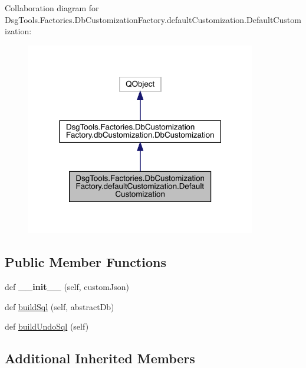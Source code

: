 Collaboration diagram for Dsg\+Tools.\+Factories.\+Db\+Customization\+Factory.\+default\+Customization.\+Default\+Customization\+:
\nopagebreak
\begin{figure}[H]
\begin{center}
\leavevmode
\includegraphics[width=285pt]{class_dsg_tools_1_1_factories_1_1_db_customization_factory_1_1default_customization_1_1_default_customization__coll__graph}
\end{center}
\end{figure}
\subsection*{Public Member Functions}
\begin{DoxyCompactItemize}
\item 
\mbox{\label{class_dsg_tools_1_1_factories_1_1_db_customization_factory_1_1default_customization_1_1_default_customization_a96a16b7814753b054eea546a6156b2c2}} 
def {\bfseries \+\_\+\+\_\+init\+\_\+\+\_\+} (self, custom\+Json)
\item 
def \mbox{\hyperlink{class_dsg_tools_1_1_factories_1_1_db_customization_factory_1_1default_customization_1_1_default_customization_a76ce8dac45f8afe14c21c0ffc0cc8569}{build\+Sql}} (self, abstract\+Db)
\item 
def \mbox{\hyperlink{class_dsg_tools_1_1_factories_1_1_db_customization_factory_1_1default_customization_1_1_default_customization_af0486a0c895ef71cb78408d61c7def59}{build\+Undo\+Sql}} (self)
\end{DoxyCompactItemize}
\subsection*{Additional Inherited Members}


